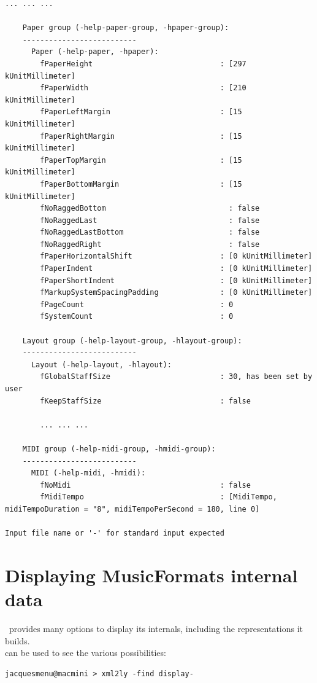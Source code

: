 \begin{lstlisting}[language=Terminal]
		... ... ...

    Paper group (-help-paper-group, -hpaper-group):
    --------------------------
      Paper (-help-paper, -hpaper):
        fPaperHeight                             : [297 kUnitMillimeter]
        fPaperWidth                              : [210 kUnitMillimeter]
        fPaperLeftMargin                         : [15 kUnitMillimeter]
        fPaperRightMargin                        : [15 kUnitMillimeter]
        fPaperTopMargin                          : [15 kUnitMillimeter]
        fPaperBottomMargin                       : [15 kUnitMillimeter]
        fNoRaggedBottom                            : false
        fNoRaggedLast                              : false
        fNoRaggedLastBottom                        : false
        fNoRaggedRight                             : false
        fPaperHorizontalShift                    : [0 kUnitMillimeter]
        fPaperIndent                             : [0 kUnitMillimeter]
        fPaperShortIndent                        : [0 kUnitMillimeter]
        fMarkupSystemSpacingPadding              : [0 kUnitMillimeter]
        fPageCount                               : 0
        fSystemCount                             : 0

    Layout group (-help-layout-group, -hlayout-group):
    --------------------------
      Layout (-help-layout, -hlayout):
        fGlobalStaffSize                         : 30, has been set by user
        fKeepStaffSize                           : false

		... ... ...

    MIDI group (-help-midi-group, -hmidi-group):
    --------------------------
      MIDI (-help-midi, -hmidi):
        fNoMidi                                  : false
        fMidiTempo                               : [MidiTempo, midiTempoDuration = "8", midiTempoPerSecond = 180, line 0]

Input file name or '-' for standard input expected
\end{lstlisting}


\section{Displaying MusicFormats internal data}\label{Displaying MusicFormats internal data}

\mf\ provides many options to display its internals, including the representations it builds. \\
 can be used to see the various possibilities:
\begin{lstlisting}[language=Terminal]
jacquesmenu@macmini > xml2ly -find display-
\end{lstlisting}

